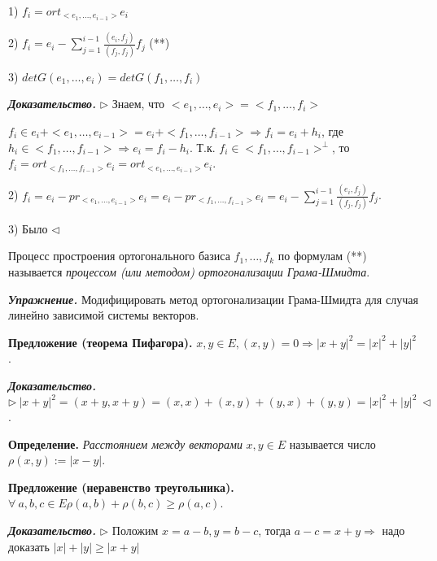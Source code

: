 1) $f_i = ort_{<e_1, \dots, e_{i-1}>} e_i$

2) $f_i = e_i - \sum\limits_{j=1}^{i-1} \frac{(e_i, f_j)}{(f_j, f_j)} f_j$ (**)

3) $det G(e_1, \dots, e_i) = det G(f_1, \dots, f_i)$

\vspace{\baselineskip}
\textbf{\textit{Доказательство.}} $\rhd$ Знаем, что $<e_1, \dots, e_i> = <f_1, \dots, f_i>$

$f_i \in e_i + <e_1, \dots, e_{i-1}> = e_i + <f_1, \dots, f_{i-1}> \Rightarrow f_i = e_i + h_i$, где $h_i \in <f_1, \dots, f_{i-1}> \Rightarrow e_i = f_i - h_i$. Т.к. $f_i \in <f_1, \dots, f_{i-1}>^{\bot}$, то $f_i = ort_{<f_1, \dots, f_{i-1}>} e_i = ort_{<e_1, \dots, e_{i-1}>} e_i$.

2) $f_i = e_i - pr_{<e_1, \dots, e_{i-1}>} e_i = e_i - pr_{<f_1, \dots, f_{i-1}>} e_i = e_i - \sum\limits_{j=1}^{i-1} \frac{(e_i, f_j)}{(f_j, f_j)} f_j$.

3) Было $\lhd$

\vspace{\baselineskip}
Процесс простроения ортогонального базиса $f_1, \dots, f_k$ по формулам (**) называется \textit{процессом (или методом) ортогонализации Грама-Шмидта}.

\vspace{\baselineskip}
\textbf{\textit{Упражнение.}} Модифицировать метод ортогонализации Грама-Шмидта для случая линейно зависимой системы векторов.

\vspace{\baselineskip}
\textbf{Предложение (теорема Пифагора).} $x, y \in E, (x, y) = 0 \Rightarrow |x+y|^2 = |x|^2 + |y|^2$.

\vspace{\baselineskip}
\textbf{\textit{Доказательство.}} $\rhd \ |x+y|^2 = (x+y, x+y) = (x,x) + (x,y) + (y,x) + (y,y) = |x|^2 + |y|^2 \ \lhd$.

\vspace{\baselineskip}
\textbf{Определение.} \textit{Расстоянием между векторами} $x, y \in E$ называется число $\rho (x, y) := |x - y|$. 

\vspace{\baselineskip}
\textbf{Предложение (неравенство треугольника).} $\forall \ a, b, c \in E \rho(a, b) + \rho(b, c) \geq \rho(a, c)$.

\vspace{\baselineskip}
\textbf{\textit{Доказательство.}} $\rhd$ Положим $x = a - b, y = b - c$, тогда $a - c = x + y \Rightarrow$  надо доказать $|x| + |y| \geq |x + y|$

